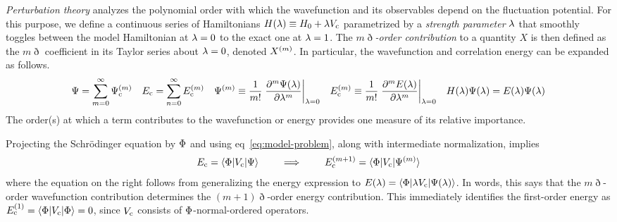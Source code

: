 \documentclass[11pt]{article}
\numberwithin{equation}{section}
\begin{document}
\begin{dfn}
\textit{Perturbation theory} analyzes the polynomial order with which the wavefunction and its observables depend on the fluctuation potential.
For this purpose, we define a continuous series of Hamiltonians
$
  H(\lambda )
\equiv
  H_0
+
  \lambda 
  V_{\mathrm{c}}
$
parametrized by a \textit{strength parameter} $\lambda $ that smoothly toggles between the model Hamiltonian at $\lambda =0$ to the exact one at $\lambda =1$.
The \textit{$m\eth$-order contribution} to a quantity $X$ is then defined as the $m\eth$ coefficient in its Taylor series about $\lambda =0$, denoted $X^{(m)}$.
In particular, the wavefunction and correlation energy can be expanded as follows.
\begin{align}
\label{eq:series-schrodinger-equation}
  \Psi 
=
  \sum_{m=0}^\infty
  \Psi _{\mathrm{c}}^{(m)}
&&
  E_{\mathrm{c}}
=
  \sum_{n=0}^\infty
  E_{\mathrm{c}}^{(m)}
&&
  \Psi ^{(m)}
\equiv
  \frac {1}{m!}
  \left.
    \frac {\partial^m\Psi (\lambda )}{\partial\lambda ^m}
  \right|_{\lambda =0}
&&
  E_{\mathrm{c}}^{(m)}
\equiv
  \frac {1}{m!}
  \left.
    \frac {\partial^mE(\lambda )}{\partial\lambda ^m}
  \right|_{\lambda =0}
&&
  H(\lambda )
  \Psi (\lambda )
=
  E(\lambda )
  \Psi (\lambda )
\end{align}
The order(s) at which a term contributes to the wavefunction or energy provides one measure of its relative importance.
\end{dfn}

\begin{rmk}
Projecting the Schr\"odinger equation by $\Phi $ and using eq~\ref{eq:model-problem}, along with intermediate normalization, implies
\begin{align}
  E_{\mathrm{c}}
=
  \langle\Phi |V_{\mathrm{c}}|\Psi \rangle
\hspace{20pt}
\implies
\hspace{20pt}
  E_{\mathrm{c}}^{(m+1)}
=
  \langle\Phi |V_{\mathrm{c}}|\Psi ^{(m)}\rangle
\end{align}
where the equation on the right follows from generalizing the energy expression to
$
  E(\lambda )
=
  \langle\Phi |\lambda  V_{\mathrm{c}}|\Psi (\lambda )\rangle
$.
In words, this says that the $m\eth$-order wavefunction contribution determines the $(m+1)\eth$-order energy contribution.
This immediately identifies the first-order energy as
$
  E_{\mathrm{c}}^{(1)}
=
  \langle\Phi |V_{\mathrm{c}}|\Phi \rangle
=
  0
$,
since $V_{\mathrm{c}}$ consists of $\Phi $-normal-ordered operators.
\end{rmk}
\end{document}
